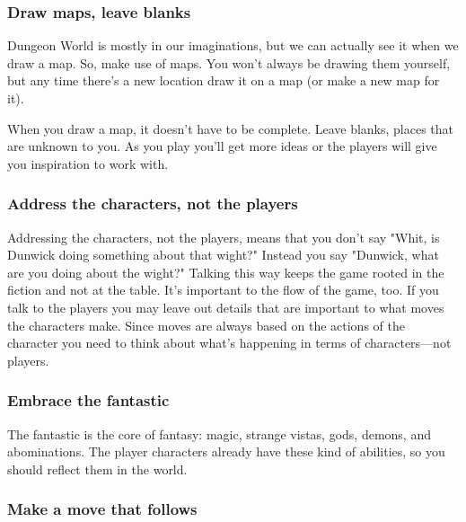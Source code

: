 
\subsubsection{Draw maps, leave blanks}      
 

Dungeon World is mostly in our imaginations, but we can actually see it when we draw a map. So, make use of maps. You won't always be drawing them yourself, but any time there's a new location draw it on a map (or make a new map for it).

 

When you draw a map, it doesn't have to be complete. Leave blanks, places that are unknown to you. As you play you'll get more ideas or the players will give you inspiration to work with.

 
\subsubsection{Address the characters, not the players}     
 

Addressing the characters, not the players, means that you don't say "Whit, is Dunwick doing something about that wight?" Instead you say "Dunwick, what are you doing about the wight?" Talking this way keeps the game rooted in the fiction and not at the table. It's important to the flow of the game, too. If you talk to the players you may leave out details that are important to what moves the characters make. Since moves are always based on the actions of the character you need to think about what's happening in terms of characters—not players.

 
\subsubsection{Embrace the fantastic}    
 

The fantastic is the core of fantasy: magic, strange vistas, gods, demons, and abominations. The player characters already have these kind of abilities, so you should reflect them in the world.

 
\subsubsection{Make a move that follows}   
 

